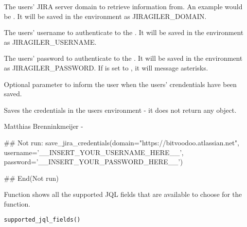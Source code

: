 \documentclass[a4paper]{book}
\begin{document}
\begin{Arguments}
\begin{ldescription}
\item[\code{domain}] The users' JIRA server domain to retrieve information from. An example would be . It will be saved in the environment as JIRAGILER\_DOMAIN.

\item[\code{username}] The users' username to authenticate to the . It will be saved in the environment as JIRAGILER\_USERNAME.

\item[\code{password}] The users' password to authenticate to the . It will be saved in the environment as JIRAGILER\_PASSWORD. If  is set to , it will message asterisks.

\item[\code{verbose}] Optional parameter to inform the user when the users' crendentials have been saved.
\end{ldescription}
\end{Arguments}
%
\begin{Value}
Saves the credentials in the users environment - it does not return any object.
\end{Value}
%
\begin{Author}\relax
Matthias Brenninkmeijer - 
\end{Author}
%
\begin{Examples}
\begin{ExampleCode}
## Not run: 
save_jira_credentials(domain="https://bitvoodoo.atlassian.net",
                      username='__INSERT_YOUR_USERNAME_HERE__',
                      password='__INSERT_YOUR_PASSWORD_HERE__')

## End(Not run)
\end{ExampleCode}
\end{Examples}
%
\begin{Description}\relax
Function shows all the supported JQL fields that are available to choose for the  function.
\end{Description}
%
\begin{Usage}
\begin{verbatim}
supported_jql_fields()
\end{verbatim}
\end{Usage}
\end{document}
